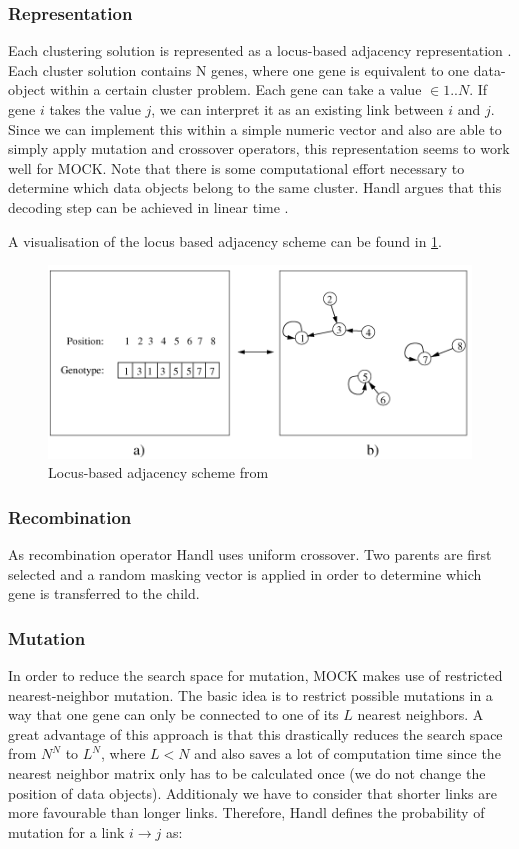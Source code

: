 \documentclass[parskip=half,DIV=14]{scrartcl}\usepackage[]{graphicx}\usepackage[]{color}
\begin{document}
\subsubsection{Representation}
Each clustering solution is represented as a locus-based adjacency representation \cite{handl}. Each cluster solution contains N genes, where one gene is equivalent to one data-object within a certain cluster problem. Each gene can take a value $\in 1..N$. If gene $i$ takes the value $j$, we can interpret it as an existing link between $i$ and $j$. Since we can implement this within a simple numeric vector and also are able to simply apply mutation and crossover operators, this representation seems to work well for MOCK. Note that there is some computational effort necessary to determine which data objects belong to the same cluster. Handl argues that this decoding step can be achieved in linear time \cite{handl}.

A visualisation of the locus based adjacency scheme can be found in \ref{fig:locus}.

\begin{figure}[h]
\begin{center}
\includegraphics{figure/locus.png}
\caption{Locus-based adjacency scheme from \cite{handl2007}  }
\label{fig:locus}
\end{center}
\end{figure}

\subsubsection{Recombination}
As recombination operator Handl uses uniform crossover. Two parents are first selected and a random masking vector is applied in order to determine which gene is transferred to the child.

\subsubsection{Mutation}
In order to reduce the search space for mutation, MOCK makes use of restricted nearest-neighbor mutation. The basic idea is to restrict possible mutations in a way that one gene can only be connected to one of its $L$ nearest neighbors. A great advantage of this approach is that this drastically reduces the search space from $N^N$ to $L^N$, where $L<N$ and also saves a lot of computation time since the nearest neighbor matrix only has to be calculated once (we do not change the position of data objects). Additionaly we have to consider that shorter links are more favourable than longer links. Therefore, Handl defines the probability of mutation for a link $i\rightarrow j$ as:
\end{document}
